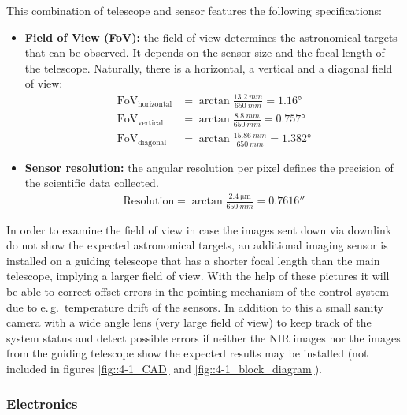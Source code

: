 This combination of telescope and sensor features the following specifications:

\begin{itemize}
	\item \textbf{Field of View (FoV):} the field of view determines the astronomical targets that can be observed. It depends on the sensor size and the focal length of the telescope. Naturally, there is a horizontal, a vertical and a diagonal field of view:
	\begin{align}
		\text{FoV}_\text{horizontal} &= \arctan \frac{\SI{13.2}{mm}}{\SI{650}{mm}} = \ang{1,16} \\
		\text{FoV}_\text{vertical} &= \arctan \frac{\SI{8.8}{mm}}{\SI{650}{mm}} = \ang{0,757} \\
		\text{FoV}_\text{diagonal} &= \arctan \frac{\SI{15,86}{mm}}{\SI{650}{mm}} = \ang{1,382}
	\end{align}
	\item \textbf{Sensor resolution:} the angular resolution per pixel defines the precision of the scientific data collected.
	\begin{align}
		\text{Resolution} = \arctan \frac{\SI{2,4}{\um}}{\SI{650}{mm}} %
		 = \ang{;;0,7616}
	\end{align}
\end{itemize}

In order to examine the field of view in case the images sent down via downlink do not show the expected astronomical targets, an additional imaging sensor is installed on a guiding telescope that has a shorter focal length than the main telescope, implying a larger field of view. With the help of these pictures it will be able to correct offset errors in the pointing mechanism of the control system due to e.\,g.~temperature drift of the sensors. In addition to this a small sanity camera with a wide angle lens (very large field of view) to keep track of the system status and detect possible errors if neither the NIR images nor the images from the guiding telescope show the expected results may be installed (not included in figures \ref{fig::4-1_CAD} and \ref{fig::4-1_block_diagram}).



\subsubsection{Electronics}

